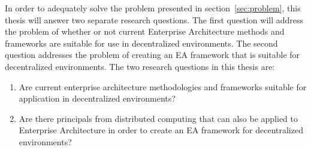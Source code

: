 In order to adequately solve the problem presented in section~\ref{sec:problem}, this thesis will answer two separate research questions. The first question will address the problem of whether or not current Enterprise Architecture methods and frameworks are suitable for use in decentralized environments. The second question addresses the problem of creating an EA framework that is suitable for decentralized environments. The two research questions in this thesis are:

\begin{enumerate}
\item Are current enterprise architecture methodologies and frameworks suitable for application in decentralized environments?
\item Are there principals from distributed computing that can also be applied to Enterprise Architecture in order to create an EA framework for decentralized environments? 
\end{enumerate}